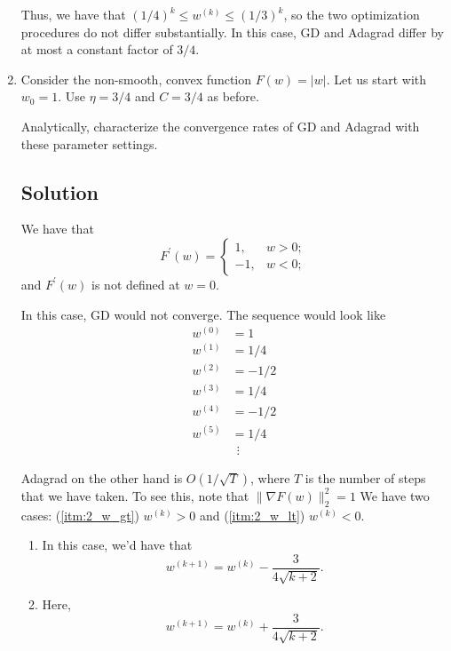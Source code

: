 \documentclass[letterpaper,11pt]{article}
\begin{document}
\begin{enumerate}
  Thus, we have that $\left(1/4\right)^k \leq w^{(k)} \leq \left(1/3\right)^k$,
  so the two optimization procedures do not differ substantially.  In this case,
  GD and Adagrad differ by at most a constant factor of $3/4$.
  
\item Consider the non-smooth, convex function $F(w) = \lvert w \rvert$. Let us
  start with $w_0 = 1$. Use $\eta = 3/4$ and $C = 3/4$ as before.
  
  Analytically, characterize the convergence rates of GD and Adagrad
  with these parameter settings.

  \subsection*{Solution}

  We have that
  \begin{equation}
    F^\prime\left(w\right) = \begin{cases}
      1, & w > 0; \\
      -1, & w < 0;
    \end{cases}
  \end{equation}
  and $F^\prime(w)$ is not defined at $w = 0$.

  In this case, GD would not converge. The sequence would look like
  \begin{align*}
    w^{(0)} &= 1 \\
    w^{(1)} &= 1/4 \\
    w^{(2)} &= -1/2 \\
    w^{(3)} &= 1/4 \\
    w^{(4)} &= -1/2 \\
    w^{(5)} &= 1/4 \\
            &~~\vdots
  \end{align*}

  Adagrad on the other hand is $O\left(1/\sqrt{T}\right)$, where $T$ is the
  number of steps that we have taken. To see this, note that
  $\lVert \nabla F(w) \rVert^2_2 = 1$ We have two cases: (\ref{itm:2_w_gt})
  $w^{(k)} > 0$ and (\ref{itm:2_w_lt}) $w^{(k)} < 0$.
  \begin{enumerate}
  \item In this case, we'd have that
    \begin{equation*}
      w^{(k + 1)} = w^{(k)} - \frac{3}{4\sqrt{k + 2}}.
    \end{equation*}
    \label{itm:2_w_gt}
  \item Here,
    \begin{equation*}
      w^{(k + 1)} = w^{(k)} + \frac{3}{4\sqrt{k + 2}}.
    \end{equation*}
    \label{itm:2_w_lt}
  \end{enumerate}
  

\end{enumerate}
\end{document}
